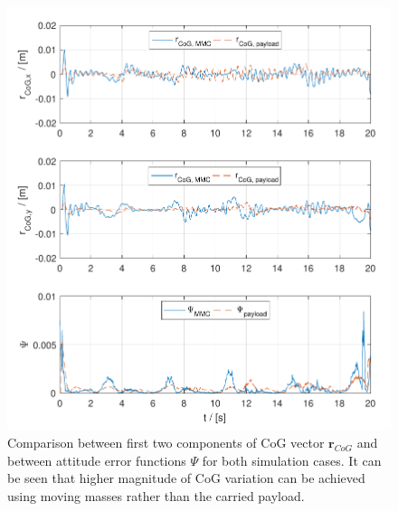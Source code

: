 \begin{figure}[h!]
	\centering
	\includegraphics[width=\columnwidth]{./pictures/both_cog_err.pdf}
	\caption{Comparison between first two components of CoG vector $\textbf{r}_{CoG}$ and between attitude error functions $\Psi$ for both simulation cases. It can be seen that higher magnitude of CoG variation can be achieved using moving masses rather than the carried payload.}
	\label{fig:cog_error}
\end{figure}